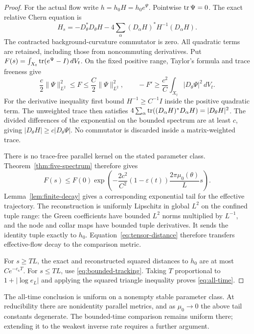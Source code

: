 \begin{proof}
For the actual flow write $h=h_0H=h_0e^{\Psi}$. Pointwise $\operatorname{tr} \Psi=0$.
The exact relative Chern equation is
\[
 H_s=-D_\theta^*D_\theta H
       -4\sum_\alpha(D_\alpha H)^*H^{-1}(D_\alpha H).
\]
The contracted background-curvature commutator is zero. All quadratic
terms are retained, including those from noncommuting derivatives.
Put $F(s)=\int_{X_t}\operatorname{tr}(e^{\Psi}-I)\,dV_t$. On the fixed positive range,
Taylor's formula and trace freeness give
\[
 \frac c2\|\Psi\|_{L^2}^2\le F\le\frac C2\|\Psi\|_{L^2}^2,
 \qquad -F'\ge\frac{c^2}{C}\int_{X_t}|D_\theta \Psi|^2\,dV_t.
\]
For the derivative inequality first bound $H^{-1}\ge C^{-1}I$
inside the positive quadratic term. The unweighted trace then satisfies
$4\sum_\alpha\operatorname{tr}((D_\alpha H)^*D_\alpha H)=|D_\theta H|^2$.
The divided differences of the exponential on the bounded spectrum
are at least $c$, giving $|D_\theta H|\ge c|D_\theta \Psi|$.
No commutator is discarded inside a matrix-weighted trace.

There is no trace-free parallel kernel on the stated parameter class.
Theorem~\ref{thm:five-spectrum} therefore gives
\[
 F(s)\le F(0)\exp\left(
 -\frac{2c^2}{C^2}(1-\varepsilon(t))\frac{2\pi\mu_0(\theta)}{L}s
 \right).
\]
Lemma~\ref{lem:finite-decay} gives a corresponding exponential tail
for the effective trajectory. The reconstruction is uniformly Lipschitz
in global $L^2$ on the confined tuple range: the Green coefficients
have bounded $L^2$ norms multiplied by $L^{-1}$, and the node and
collar maps have bounded tuple derivatives. It sends the identity tuple
exactly to $h_0$. Equation~\eqref{eq:tensor-distance} therefore
transfers effective-flow decay to the comparison metric.

For $s\ge TL$, the exact and reconstructed squared distances to
$h_0$ are at most $C e^{-c_\kappa T}$. For $s\le TL$, use
\eqref{eq:bounded-tracking}. Taking $T$ proportional to
$1+|\log e_L|$ and applying the squared triangle inequality proves
\eqref{eq:all-time}.
\end{proof}

The all-time conclusion is uniform on a nonempty stable parameter class.
At reducibility there are nonidentity parallel metrics, and as
$\mu_0\to0$ the above tail constants degenerate. The bounded-time
comparison remains uniform there; extending it to the weakest inverse
rate requires a further argument.
